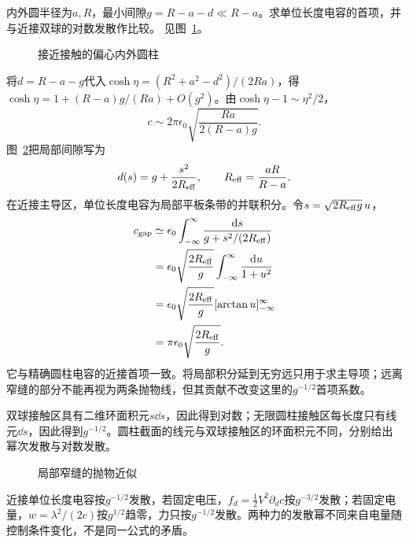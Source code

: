 \begin{exercise}[偏心电容接近接触时的发散]\label{ex:es3-h9}
内外圆半径为$a,R$，最小间隙$g=R-a-d\ll R-a$。求单位长度电容的首项，并与近接双球的对数发散作比较。 见图~\ref{fig:es3-h9-q}。
\end{exercise}

\begin{figure}[H]\centering
{}
\caption{接近接触的偏心内外圆柱}\label{fig:es3-h9-q}
\end{figure}
\begin{solution}
将$d=R-a-g$代入$\cosh\eta=(R^2+a^2-d^2)/(2Ra)$，得$\cosh\eta=1+(R-a)g/(Ra)+O(g^2)$。由$\cosh\eta-1\sim\eta^2/2$，
\[c\sim2\pi\epsilon_0\sqrt{\frac{Ra}{2(R-a)g}}.
\]
图~\ref{fig:es3-h9-s}把局部间隙写为
\[d(s)=g+\frac{s^2}{2R_{\rm eff}},\qquad
R_{\rm eff}=\frac{aR}{R-a}.
\]
在近接主导区，单位长度电容为局部平板条带的并联积分。令$s=\sqrt{2R_{\rm eff}g}\,u$，
\[\begin{aligned}
c_{\rm gap}&\simeq\epsilon_0\int_{-\infty}^{\infty}
\frac{\mathop{}\!\mathrm d s}{g+s^2/(2R_{\rm eff})}\\
&=\epsilon_0\sqrt{\frac{2R_{\rm eff}}g}
\int_{-\infty}^{\infty}\frac{\mathop{}\!\mathrm d u}{1+u^2}\\
&=\epsilon_0\sqrt{\frac{2R_{\rm eff}}g}[\arctan u]_{-\infty}^{\infty}\\
&=\pi\epsilon_0\sqrt{\frac{2R_{\rm eff}}g}.
\end{aligned}\]
它与精确圆柱电容的近接首项一致。将局部积分延到无穷远只用于求主导项；远离窄缝的部分不能再视为两条抛物线，但其贡献不改变这里的$g^{-1/2}$首项系数。

双球接触区具有二维环面积元$s\dd s$，因此得到对数；无限圆柱接触区每长度只有线元$\dd s$，因此得到$g^{-1/2}$。圆柱截面的线元与双球接触区的环面积元不同，分别给出幂次发散与对数发散。
\begin{figure}[H]\centering
{}
\caption{局部窄缝的抛物近似}\label{fig:es3-h9-s}
\end{figure}


近接单位长度电容按$g^{-1/2}$发散，若固定电压，$f_d=\tfrac12V^2\partial_dc$按$g^{-3/2}$发散；若固定电量，$w=\lambda^2/(2c)$按$g^{1/2}$趋零，力只按$g^{-1/2}$发散。两种力的发散幂不同来自电量随控制条件变化，不是同一公式的矛盾。
\end{solution}

